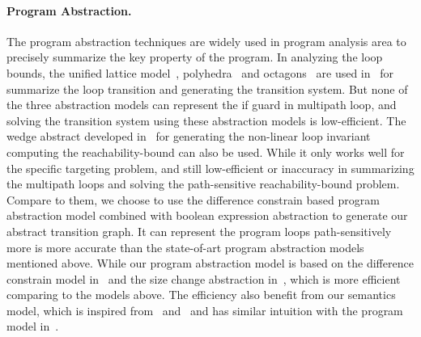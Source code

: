 
\paragraph*{Program Abstraction.}
The program abstraction techniques are widely used in program analysis area to precisely summarize the key property of the program.
In analyzing the loop bounds, the unified lattice model~\cite{CousotH78}, polyhedra~\cite{CousotC77} and octagons~\cite{Mine06} are used in~\cite{GulwaniZ10} for summarize the loop transition and generating the transition system.
But none of the three abstraction models can represent the if guard in multipath loop, and solving the transition system using these abstraction models is low-efficient.
The wedge abstract developed in~\cite{KincaidCBR18} for generating the non-linear loop invariant
computing the reachability-bound can also be used. While it only works well for the specific targeting problem, and still low-efficient or inaccuracy in summarizing the multipath loops and solving the path-sensitive reachability-bound problem. 
Compare to them, we choose to use the difference constrain based program abstraction model combined with boolean expression abstraction to generate our abstract transition graph. It can represent the program loops path-sensitively more is more accurate than the state-of-art program abstraction models mentioned above.
While our program abstraction model is based on the difference constrain model in~\cite{SinnZV17} and the size change abstraction in~\cite{SinnZV14}, which is more efficient comparing to the models above. The efficiency also benefit from our
semantics model, which is inspired from~\cite{Cousot19a} and~\cite{Cousot19} and has similar intuition with the program model in~\cite{SinnZV17}.

